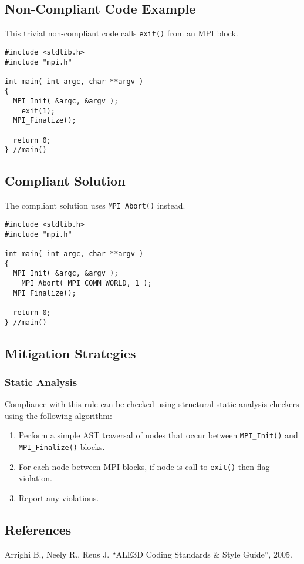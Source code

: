 \subsection{Non-Compliant Code Example}
This trivial non-compliant code calls {\tt exit()} from an MPI block.

\begin{verbatim}
#include <stdlib.h>
#include "mpi.h"

int main( int argc, char **argv )
{
  MPI_Init( &argc, &argv );
    exit(1);
  MPI_Finalize();

  return 0;
} //main()
\end{verbatim}

\subsection{Compliant Solution}
The compliant solution uses {\tt MPI\_Abort()} instead.

\begin{verbatim}
#include <stdlib.h>
#include "mpi.h"

int main( int argc, char **argv )
{
  MPI_Init( &argc, &argv );
    MPI_Abort( MPI_COMM_WORLD, 1 );
  MPI_Finalize();

  return 0;
} //main()
\end{verbatim}

\subsection{Mitigation Strategies}
\subsubsection{Static Analysis} 

Compliance with this rule can be checked using structural static analysis checkers using the following algorithm:

\begin{enumerate}
\item Perform a simple AST traversal of nodes that occur between {\tt MPI\_Init()} and {\tt MPI\_Finalize()} blocks.
\item For each node between MPI blocks, if node is call to {\tt exit()} then flag violation.
\item Report any violations. 
\end{enumerate}

\subsection{References}
Arrighi B., Neely R., Reus J. ``ALE3D Coding Standards \& Style Guide'', 2005.
